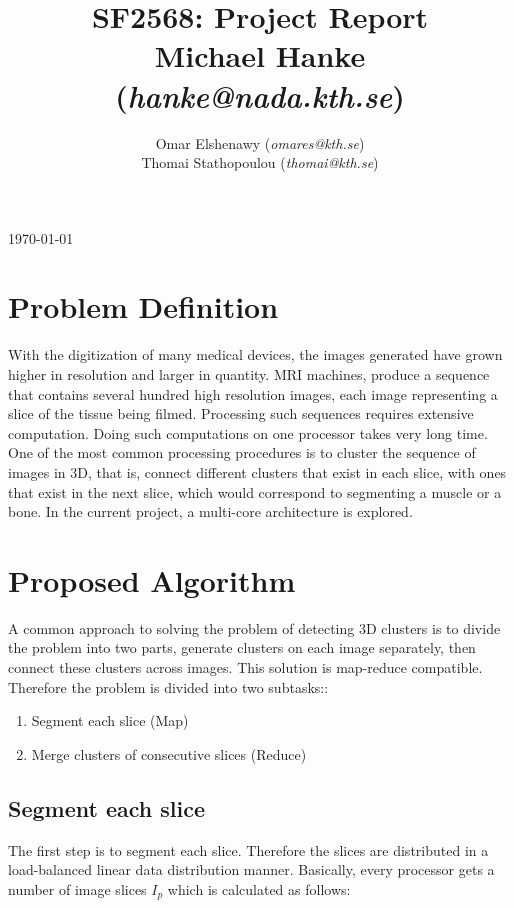 \documentclass[a4paper,12pt]{article}
\title{SF2568: Project Report \\ Michael Hanke (\textit{hanke@nada.kth.se})}
\author{\hspace*{-0.5cm}
  \begin{tabular}{cc}
  Omar Elshenawy (\textit{omares@kth.se})\\ Thomai Stathopoulou (\textit{thomai@kth.se}) \\ 
  \end{tabular}
}
\date{}
\begin{document}
	\maketitle

\thispagestyle{empty}	%


\vfill
\begin{center}
	\today
\end{center}
\clearpage		%
	
	
\section{Problem Definition}
With the digitization of many medical devices, the images generated have grown higher in resolution and larger in quantity. MRI machines, produce a sequence that contains several hundred high resolution images, each image representing a slice of the tissue being filmed. Processing such sequences requires extensive computation. Doing such computations on one processor takes very long time. One of the most common processing procedures is to cluster the sequence of images in 3D, that is, connect different clusters that exist in each slice, with ones that exist in the next slice, which would correspond to segmenting a muscle or a bone. In the current project, a multi-core architecture is explored.
		
	\section{Proposed Algorithm}\label{sec:alg}
A common approach to solving the problem of detecting 3D clusters is to divide the problem into two parts, generate clusters on each image separately, then connect these clusters across images. This solution is map-reduce compatible. Therefore the problem is divided into two subtasks::
		\begin{enumerate}
			\item Segment each slice (Map) \label{task:1}
			\item Merge clusters of consecutive slices (Reduce) \label{task:2}
		\end{enumerate}
		\subsection{Segment each slice}
The first step is to segment each slice. Therefore the slices are distributed in a load-balanced linear data distribution manner. Basically, every processor gets a number of image slices $I_p$ which is calculated as follows:
			
\end{document}
